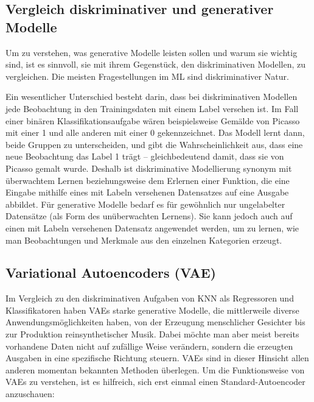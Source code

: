 \subsection{Vergleich diskriminativer und generativer Modelle}\label{Vergleich diskriminativer und generativer Modelle}
Um zu verstehen, was generative Modelle leisten sollen und warum sie wichtig sind, ist es sinnvoll, sie mit ihrem Gegenstück, den diskriminativen Modellen, zu vergleichen. Die meisten Fragestellungen im ML sind diskriminativer Natur.

Ein wesentlicher Unterschied besteht darin, dass bei diskriminativen Modellen jede Beobachtung in den Trainingsdaten mit einem Label versehen ist. Im Fall einer binären Klassifikationsaufgabe wären beispielsweise Gemälde von Picasso mit einer 1 und alle anderen mit einer 0 gekennzeichnet. Das Modell lernt dann, beide Gruppen zu unterscheiden, und gibt die Wahrscheinlichkeit aus, dass eine neue Beobachtung das Label 1 trägt – gleichbedeutend damit, dass sie von Picasso gemalt wurde.
Deshalb ist diskriminative Modellierung synonym mit überwachtem Lernen beziehungsweise dem Erlernen einer Funktion, die eine Eingabe mithilfe eines mit Labeln versehenen Datensatzes auf eine Ausgabe abbildet.
Für generative Modelle bedarf es für gewöhnlich nur ungelabelter Datensätze (als Form des unüberwachten Lernens). Sie kann jedoch auch auf einen mit Labeln versehenen Datensatz angewendet werden, um zu lernen, wie man Beobachtungen und Merkmale aus den einzelnen Kategorien erzeugt.

\subsection{Variational Autoencoders (VAE)}\label{Variational Autoencoders (VAE)}
Im Vergleich zu den diskriminativen Aufgaben von KNN als Regressoren und Klassifikatoren haben VAEs starke generative Modelle, die mittlerweile diverse Anwendungsmöglichkeiten haben, von der Erzeugung menschlicher Gesichter bis zur Produktion reinsynthetischer Musik. Dabei möchte man aber meist bereits vorhandene Daten nicht auf zufällige Weise verändern, sondern die erzeugten Ausgaben in eine spezifische Richtung steuern. VAEs sind in dieser Hinsicht allen anderen momentan bekannten Methoden überlegen. Um die Funktionsweise von VAEs zu verstehen, ist es hilfreich, sich erst einmal einen Standard-Autoencoder anzuschauen:

